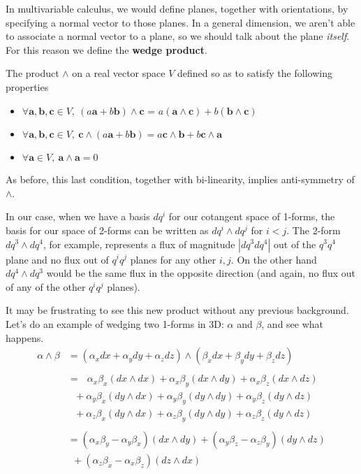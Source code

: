 	
	In multivariable calculus, we would define planes, together with orientations, by specifying a normal vector to those planes. In a general dimension, we aren't able to associate a normal vector to a plane, so we should talk about the plane \emph{itself}. For this reason we define the \textbf{wedge product}. 
	
	\begin{defn}\label{def:wedge}
		The product $\wedge$ on a real vector space $V$ defined so as to satisfy the following properties
		\begin{itemize}
			\item $ \forall \mathbf a,\mathbf b, \mathbf c \in V, ~ (a \mathbf a + b \mathbf b) \wedge \mathbf c$ = $ a (\mathbf a \wedge \mathbf c) + b (\mathbf b \wedge \mathbf c)$
			\item $ \forall \mathbf a,\mathbf b, \mathbf c \in V, ~ \mathbf c \wedge (a \mathbf a + b \mathbf b) = a \mathbf c \wedge \mathbf b + b \mathbf c \wedge \mathbf a$
			\item $\forall \mathbf a\in V, ~ \mathbf a \wedge \mathbf a = 0$
		\end{itemize}
	\end{defn}
	As before, this last condition, together with bi-linearity, implies anti-symmetry of $\wedge$.
	
	In our case, when we have a basis $dq^i$ for our cotangent space of 1-forms, the basis for our space of 2-forms can be written as $dq^i \wedge dq^j$ for $i<j$. The 2-form $dq^3 \wedge dq^4$, for example, represents a flux of magnitude $|dq^3 dq^4|$ out of the $q^3q^4$ plane and no flux out of $q^iq^j$ planes for any other $i,j$. On the other hand $dq^4 \wedge dq^3$ would be the same flux in the opposite direction (and again, no flux out of any of the other $q^i q^j$ planes).
	
	It may be frustrating to see this new product without any previous background. Let's do an example of wedging two 1-forms in 3D: $\alpha$ and $\beta$, and see what happens.
	\begin{align*}
		\alpha \wedge \beta &=(\alpha_x dx + \alpha_y dy + \alpha_z dz) \wedge (\beta_x dx + \beta_y dy + \beta_z dz) \\
		\\
		& =  ~~~ \alpha_x \beta_x (dx \wedge dx) + \alpha_x \beta_y (dx \wedge dy) + \alpha _x \beta_z (dx \wedge dz) \\
		 & ~~~ + \alpha_y \beta_x (dy \wedge dx) + \alpha_y \beta_y (dy \wedge dy) + \alpha_y \beta_z (dy \wedge dz) \\
		 & ~~~ + \alpha_z \beta_x (dy \wedge dx) + \alpha_z \beta_y (dy \wedge dy) + \alpha_z \beta_z (dy \wedge dz)\\
		 \\
		&=(\alpha_x \beta_y - \alpha_y \beta_x)(dx \wedge dy)+ (\alpha_y \beta_z - \alpha_z \beta_y)(dy \wedge dz)\\
		&  ~~ +(\alpha_z \beta_x - \alpha_x \beta_z)(dz \wedge dx) 
	\end{align*}
	
